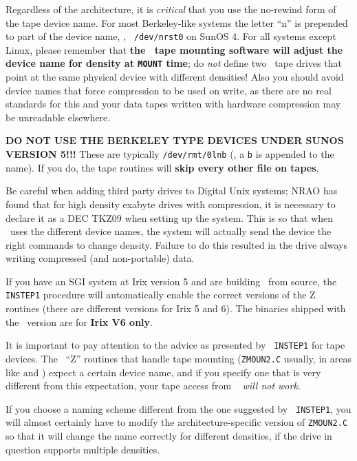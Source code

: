 Regardless of the architecture, it is {\it critical\/} that you use the
no-rewind form of the tape device name.  For most Berkeley-like systems
the letter ``n'' is prepended to part of the device name, \eg, {\tt
/dev/nrst0} on SunOS 4.  For all systems except Linux, please remember
that {\bf the \AIPS\ tape mounting software will adjust the device name
for density at \/{\tt MOUNT} time}; do {\it not\/} define two \AIPS\
tape drives that point at the same physical device with different
densities!  Also you should avoid device names that force compression to
be used on write, as there are no real standards for this and your data
tapes written with hardware compression may be unreadable elsewhere.

{\bf DO NOT USE THE BERKELEY TYPE DEVICES UNDER SUNOS VERSION 5!!!}
These are typically {\tt /dev/rmt/0lnb} (\ie, a {\tt b} is appended to
the name).  If you do, the tape routines will {\bf skip every other file
on tapes}.

Be careful when adding third party drives to Digital Unix systems; NRAO
has found that for high density exabyte drives with compression, it is
necessary to declare it as a DEC TKZ09 when setting up the system.  This
is so that when \ttaips\ uses the different device names, the system
will actually send the device the right commands to change density.
Failure to do this resulted in the drive always writing compressed (and
non-portable) data.

If you have an SGI system at Irix version 5 and are building \AIPS\ from
source, the {\tt INSTEP1} procedure will automatically enable the
correct versions of the Z routines (there are different versions for
Irix 5 and 6).  The binaries shipped with the \THISVER\ version are for
{\bf Irix V6 only}.

It is important to pay attention to the advice as presented by {\tt
INSTEP1} for tape devices.  The \AIPS\ ``Z'' routines that handle tape
mounting ({\tt ZMOUN2.C} usually, in areas like {\tt\APLSOL} and
{\tt\APLLINUX}) expect a certain device name, and if you specify one
that is very different from this expectation, your tape access from
\ttaips~ {\it will not work\/}.

If you choose a naming scheme different from the one suggested by {\tt
INSTEP1}, you will almost certainly have to modify the
architecture-specific version of {\tt ZMOUN2.C} so that it will change
the name correctly for different densities, if the drive in question
supports multiple densities.

